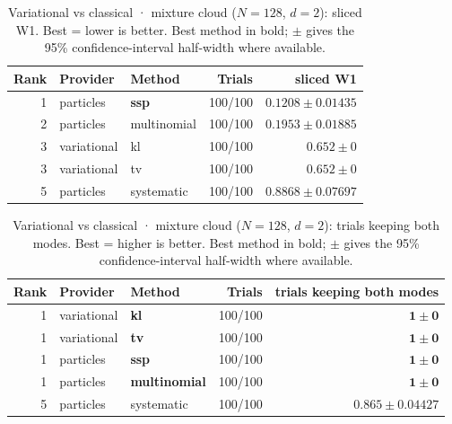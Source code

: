 

\begin{table}[!htbp]
\centering
\small
\caption{Variational vs classical · mixture cloud ($N=128$, $d=2$): sliced W1. Best = lower is better. Best method in bold; $\pm$ gives the 95\% confidence-interval half-width where available.}
\label{tab:variational-vs-classical-mixture-cloud-sliced-w1}
\begin{tabular}{rllrr}
\toprule
Rank & Provider & Method & Trials & sliced W1 \\
\midrule
1 & particles & \textbf{ssp} & 100/100 & $\mathbf{0.1208 \pm 0.01435}$ \\
2 & particles & multinomial & 100/100 & $0.1953 \pm 0.01885$ \\
3 & variational & kl & 100/100 & $0.652 \pm 0$ \\
3 & variational & tv & 100/100 & $0.652 \pm 0$ \\
5 & particles & systematic & 100/100 & $0.8868 \pm 0.07697$ \\
\bottomrule
\end{tabular}
\end{table}

\begin{table}[!htbp]
\centering
\small
\caption{Variational vs classical · mixture cloud ($N=128$, $d=2$): trials keeping both modes. Best = higher is better. Best method in bold; $\pm$ gives the 95\% confidence-interval half-width where available.}
\label{tab:variational-vs-classical-mixture-cloud-mode-coverage}
\begin{tabular}{rllrr}
\toprule
Rank & Provider & Method & Trials & trials keeping both modes \\
\midrule
1 & variational & \textbf{kl} & 100/100 & $\mathbf{1 \pm 0}$ \\
1 & variational & \textbf{tv} & 100/100 & $\mathbf{1 \pm 0}$ \\
1 & particles & \textbf{ssp} & 100/100 & $\mathbf{1 \pm 0}$ \\
1 & particles & \textbf{multinomial} & 100/100 & $\mathbf{1 \pm 0}$ \\
5 & particles & systematic & 100/100 & $0.865 \pm 0.04427$ \\
\bottomrule
\end{tabular}
\end{table}

